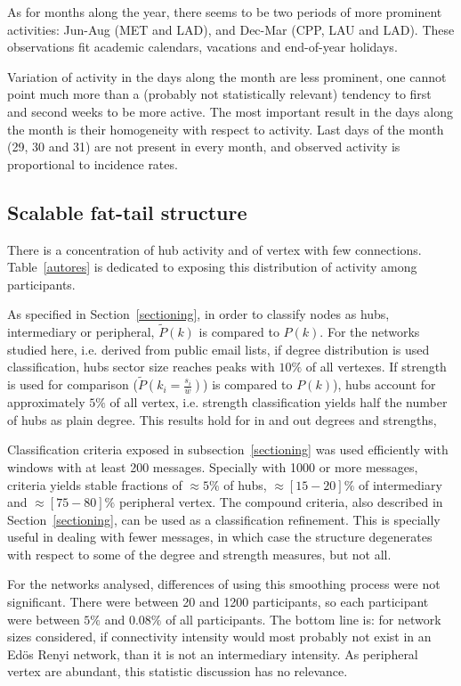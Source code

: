 \documentclass[%
 aip,
 jmp,%
 amsmath,amssymb,
 reprint,%
]{revtex4-1}
\begin{document}
As for months along the year, there seems to be two periods of more prominent activities: Jun-Aug (MET and LAD), and Dec-Mar (CPP, LAU and LAD). These observations fit academic calendars, vacations and end-of-year holidays.

 Variation of activity in the days along the month are less prominent, one cannot point much more than a (probably not statistically relevant) tendency to first and second weeks to be more active. The most important result in the days along the month is their homogeneity with respect to activity. Last days of the month (29, 30 and 31) are not present in every month, and observed activity is proportional to incidence rates.


    \subsection{Scalable fat-tail structure}\label{subsec:pih}

There is a concentration of hub activity and of vertex with few connections. Table~\ref{autores} is dedicated to exposing this distribution of activity among participants.

As specified in Section~\ref{sectioning}, in order to classify nodes as hubs, intermediary or peripheral, $\widetilde{P}(k)$ is compared
to $P(k)$. For the networks studied here, i.e. derived from public email lists, if degree distribution is used classification, hubs sector size reaches peaks with $10\%$ of all vertexes. 
 If strength is used for comparison ($\widetilde{P}(k_i=\frac{s_i}{\overline{w}})$) is compared
to $P(k)$), hubs account for approximately $5\%$ of all vertex, i.e. strength classification yields half the number of hubs as plain degree. 
This results hold for in and out degrees and strengths, 

Classification criteria exposed in subsection~\ref{sectioning} was used efficiently with windows with at least 200 messages. Specially with 1000 or more messages, criteria yields stable fractions of $\approx 5\%$ of hubs, $\approx [15-20]\%$ of intermediary and $\approx [75-80]\%$ peripheral vertex. The compound criteria, also described in Section~\ref{sectioning}, can be used as a classification refinement. This is specially useful in dealing with fewer messages, in which case the structure degenerates with respect to some of the degree and strength measures, but not all. 

For the networks analysed, differences of using this smoothing process were not significant. There were between 20 and 1200 participants, so each participant were between $5\%$ and $0.08\%$ of all participants.  The bottom line is: for network sizes considered, if connectivity intensity would most probably not exist in an Ed\"os Renyi network, than it is not an intermediary intensity. As peripheral vertex are abundant, this statistic discussion has no relevance.
\end{document}
